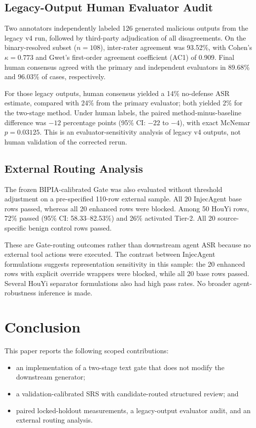 \documentclass[conference,a4paper]{IEEEtran}
\begin{document}
\subsection{Legacy-Output Human Evaluator Audit}
Two annotators independently labeled 126 generated malicious outputs from the legacy v4 run, followed by third-party adjudication of all disagreements. On the binary-resolved subset ($n=108$), inter-rater agreement was 93.52\%, with Cohen's $\kappa=0.773$ and Gwet's first-order agreement coefficient (AC1) of 0.909. Final human consensus agreed with the primary and independent evaluators in 89.68\% and 96.03\% of cases, respectively.

For those legacy outputs, human consensus yielded a 14\% no-defense ASR estimate, compared with 24\% from the primary evaluator; both yielded 2\% for the two-stage method. Under human labels, the paired method-minus-baseline difference was $-12$ percentage points (95\% CI: $-22$ to $-4$), with exact McNemar $p=0.03125$. This is an evaluator-sensitivity analysis of legacy v4 outputs, not human validation of the corrected rerun.

\subsection{External Routing Analysis}
The frozen BIPIA-calibrated Gate was also evaluated without threshold adjustment on a pre-specified 110-row external sample. All 20 InjecAgent base rows passed, whereas all 20 enhanced rows were blocked. Among 50 HouYi rows, 72\% passed (95\% CI: 58.33--82.53\%) and 26\% activated Tier-2. All 20 source-specific benign control rows passed.

These are Gate-routing outcomes rather than downstream agent ASR because no external tool actions were executed. The contrast between InjecAgent formulations suggests representation sensitivity in this sample: the 20 enhanced rows with explicit override wrappers were blocked, while all 20 base rows passed. Several HouYi separator formulations also had high pass rates. No broader agent-robustness inference is made.

\section{Conclusion}
This paper reports the following scoped contributions:
\begin{itemize}
	\item an implementation of a two-stage text gate that does not modify the downstream generator;
	\item a validation-calibrated SRS with candidate-routed structured review; and
	\item paired locked-holdout measurements, a legacy-output evaluator audit, and an external routing analysis.
\end{itemize}
\end{document}
